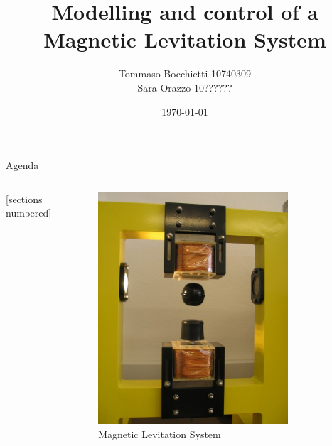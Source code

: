 \documentclass[9pt]{beamer}
\title{Modelling and control of a Magnetic Levitation System}
\date{\today}
\author{Tommaso Bocchietti 10740309 \\ Sara Orazzo 10??????}
\institute{Politecnico di Milano}
\begin{document}
\maketitle

\begin{frame}{Agenda}

    \begin{columns}[c, onlytextwidth]

        \begin{column}{0.5\textwidth}

            [sections numbered]
            \tableofcontents

        \end{column}

        \begin{column}{0.5\textwidth}

            \begin{figure}[H]
                \centering
                \includegraphics[width=0.8\textwidth]{img/ML2SEM magnetic levitation equipment.jpg}
                \caption{Magnetic Levitation System}
            \end{figure}

        \end{column}

    \end{columns}

\end{frame}
\end{document}
